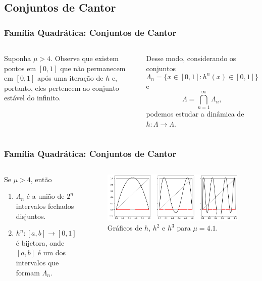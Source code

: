 \subsection{Conjuntos de Cantor}

\begin{frame}
\vspace{5pt}
\frametitle{Família Quadrática: Conjuntos de Cantor}
\begin{columns}
\column{\dimexpr\paperwidth-15pt}

Suponha $\mu > 4$. Observe que existem pontos em $[0, 1]$ que não permanecem em $[0, 1]$ após uma iteração de $h$ e, portanto, eles pertencem ao conjunto estável do infinito.

Desse modo, considerando os conjuntos
$$\Lambda_n = \lbrace x \in [0, 1] : h^n(x) \in [0, 1] \rbrace$$ e
$$\Lambda =  \bigcap_{n = 1}^\infty \Lambda_n,$$
podemos estudar a dinâmica de $h: \Lambda \to \Lambda$.

\end{columns}
\end{frame}


\begin{frame}
\frametitle{Família Quadrática: Conjuntos de Cantor}
\begin{columns}
\column{\dimexpr\paperwidth-15pt}

\begin{proposition}
Se $\mu > 4$, então
\begin{enumerate}
\item $\Lambda_n$ é a união de $2^n$ intervalos fechados disjuntos.
\item $h^n: [a, b] \to [0, 1]$ é bijetora, onde $[a, b]$ é um dos intervalos que formam $\Lambda_n$.
\end{enumerate}
\end{proposition}

\begin{figure}[!htb]
\centering
\includegraphics[scale=0.4]{images/h_4,1.png}
\caption{Gráficos de $h$, $h^2$ e $h^3$ para $\mu = 4.1$.}
\label{h_3,839}
\end{figure}

\end{columns}
\end{frame}

